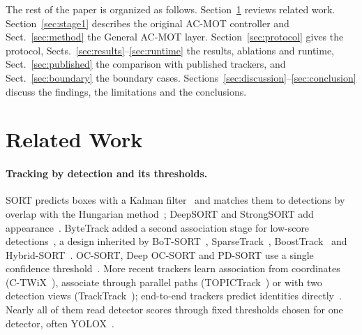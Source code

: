 \documentclass[pdflatex,sn-mathphys-num]{sn-jnl}
\begin{document}
The rest of the paper is organized as follows. Section~\ref{sec:related} reviews related work. Section~\ref{sec:stage1} describes the original AC-MOT controller and Sect.~\ref{sec:method} the General AC-MOT layer. Section~\ref{sec:protocol} gives the protocol, Sects.~\ref{sec:results}--\ref{sec:runtime} the results, ablations and runtime, Sect.~\ref{sec:published} the comparison with published trackers, and Sect.~\ref{sec:boundary} the boundary cases. Sections~\ref{sec:discussion}--\ref{sec:conclusion} discuss the findings, the limitations and the conclusions.

\section{Related Work}\label{sec:related}
\paragraph{Tracking by detection and its thresholds.} SORT predicts boxes with a Kalman filter~\cite{kalman1960} and matches them to detections by overlap with the Hungarian method~\cite{bewley2016sort,kuhn1955hungarian}; DeepSORT and StrongSORT add appearance~\cite{wojke2017deepsort,du2023strongsort}. ByteTrack added a second association stage for low-score detections~\cite{zhang2022bytetrack}, a design inherited by BoT-SORT~\cite{aharon2022botsort}, SparseTrack~\cite{liu2025sparsetrack}, BoostTrack~\cite{stanojevic2024boosttrack} and Hybrid-SORT~\cite{yang2024hybridsort}. OC-SORT, Deep OC-SORT and PD-SORT use a single confidence threshold~\cite{cao2023ocsort,maggiolino2023deepocsort,wang2025pdsort}. More recent trackers learn association from coordinates (C-TWiX~\cite{miah2025twix}), associate through parallel paths (TOPICTrack~\cite{cao2025topictrack}) or with two detection views (TrackTrack~\cite{shim2025tracktrack}); end-to-end trackers predict identities directly~\cite{zeng2022motr,gao2025motip}. Nearly all of them read detector scores through fixed thresholds chosen for one detector, often YOLOX~\cite{ge2021yolox}.
\end{document}
